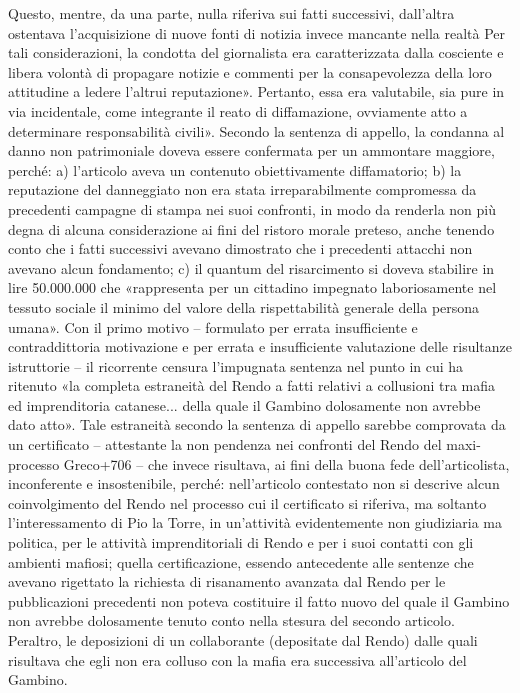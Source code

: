 Questo, mentre, da una parte, nulla riferiva sui fatti successivi, dall’altra ostentava l’acquisizione di nuove fonti di notizia invece mancante nella realtà
Per tali considerazioni, la condotta del giornalista era caratterizzata dalla cosciente e libera volontà di propagare notizie e commenti per la consapevolezza della loro attitudine a ledere l’altrui reputazione». Pertanto, essa era valutabile, sia pure in via incidentale, come integrante il reato di diffamazione, ovviamente atto a determinare responsabilità civili».
Secondo la sentenza di appello, la condanna al danno non patrimoniale doveva essere confermata per un ammontare maggiore, perché: a) l’articolo aveva un contenuto obiettivamente diffamatorio; b) la reputazione del danneggiato non era stata irreparabilmente compromessa da precedenti campagne di stampa nei suoi confronti, in modo da renderla non più degna di alcuna considerazione ai fini del ristoro morale preteso, anche tenendo conto che i fatti successivi avevano dimostrato che i precedenti attacchi non avevano alcun fondamento; c) il quantum del risarcimento si doveva stabilire in lire 50.000.000 che «rappresenta per un cittadino impegnato laboriosamente nel tessuto sociale il minimo del valore della rispettabilità generale della persona umana».
Con il primo motivo – formulato per errata insufficiente e contraddittoria motivazione e per errata e insufficiente valutazione delle risultanze istruttorie – il ricorrente censura l’impugnata sentenza nel punto in cui ha ritenuto «la completa estraneità del Rendo a fatti relativi a collusioni tra mafia ed imprenditoria catanese... della quale il Gambino dolosamente non avrebbe dato atto».
Tale estraneità secondo la sentenza di appello sarebbe comprovata da un certificato – attestante la non pendenza nei confronti del Rendo del maxi-processo Greco+706 – che invece risultava, ai fini della buona fede dell’articolista, inconferente e insostenibile, perché: nell’articolo contestato non si descrive alcun coinvolgimento del Rendo nel processo cui il certificato si riferiva, ma soltanto l’interessamento di Pio la Torre, in un’attività evidentemente non giudiziaria ma politica, per le attività imprenditoriali di Rendo e per i suoi contatti con gli ambienti mafiosi; quella certificazione, essendo antecedente alle sentenze che avevano rigettato la richiesta di risanamento avanzata dal Rendo per le pubblicazioni precedenti non poteva costituire il fatto nuovo del quale il Gambino non avrebbe dolosamente tenuto conto nella stesura del secondo articolo.
Peraltro, le deposizioni di un collaborante (depositate dal Rendo) dalle quali risultava che egli non era colluso con la mafia era successiva all’articolo del Gambino.
